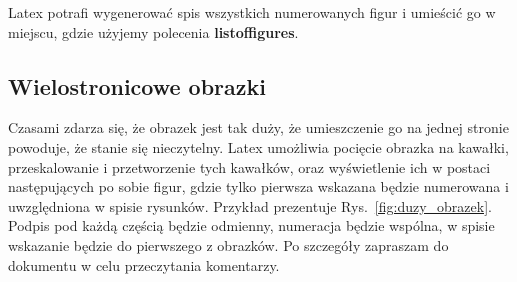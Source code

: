 \documentclass[twoside,a4paper]{book}
\begin{document}
Latex potrafi wygenerować spis wszystkich numerowanych figur i umieścić go w miejscu, gdzie użyjemy polecenia \textbf{listoffigures}.

\subsection{Wielostronicowe obrazki}

Czasami zdarza się, że obrazek jest tak duży, że umieszczenie go na jednej stronie powoduje, że stanie się nieczytelny. Latex umożliwia pocięcie obrazka na kawałki, przeskalowanie i przetworzenie tych kawałków, oraz wyświetlenie ich w postaci następujących po sobie figur, gdzie tylko pierwsza wskazana będzie numerowana i uwzględniona w spisie rysunków. Przykład prezentuje Rys.~\ref{fig:duzy_obrazek}. Podpis pod każdą częścią będzie odmienny, numeracja będzie wspólna, w spisie wskazanie będzie do pierwszego z obrazków. Po szczegóły zapraszam do dokumentu w celu przeczytania komentarzy.
\end{document}
